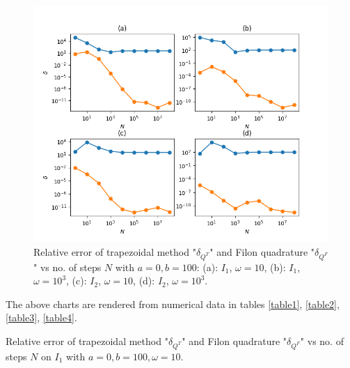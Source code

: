\begin{figure}[H]
  \centering
  \includegraphics[scale=0.8]{c4/all.png}
  \caption{Relative error of trapezoidal method "$\delta_{Q^T}$" and Filon quadrature "$\delta_{Q^F}$" vs no. of steps $N$ with $a=0,b=100$: (a): $I_1$, $\omega=10$, (b): $I_1$, $\omega=10^3$, (c): $I_2$, $\omega=10$, (d): $I_2$, $\omega=10^3$.}
  \label{figGraphAll}
\end{figure}

The above charts are rendered from numerical data in tables \ref{table1}, \ref{table2}, \ref{table3}, \ref{table4}.  
\vspace{2.5in}


\begin{table}[h!]
    \begin{center}
      \caption{Relative error of trapezoidal method "$\delta_{Q^T}$" and Filon quadrature "$\delta_{Q^F}$" vs no. of steps $N$ on $I_1$ with $a=0,b=100,\omega=10$.}
      \label{table1}
    \end{center}
  \end{table}


